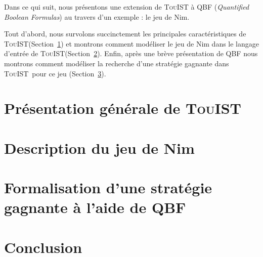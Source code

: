 \documentclass{iaf}
\newcommand{\touist}{\textsc{TouIST}\xspace}
\newcommand{\game}{jeu de Nim\xspace}
\begin{document}
Dans ce qui suit, nous présentons une extension de \touist à QBF (\emph{Quantified Boolean Formulas}) au travers d'un exemple : le \game.

Tout d'abord, nous survolons succinctement les principales caractéristiques de \touist (Section~\ref{sec:touistDescription}) et montrons comment modéliser le \game dans le langage d'entrée de \touist (Section~\ref{sec:gameDescription}). Enfin, après une brève présentation de QBF nous montrons comment modéliser la recherche d'une stratégie gagnante dans \touist\ pour ce jeu (Section~\ref{sec:QBFandTouist}).



\section{Présentation générale de \touist}
\label{sec:touistDescription}


\section{Description du \game}
\label{sec:gameDescription}


\section{Formalisation d'une stratégie gagnante à l'aide de QBF}
\label{sec:QBFandTouist}


\section{Conclusion}
\end{document}
